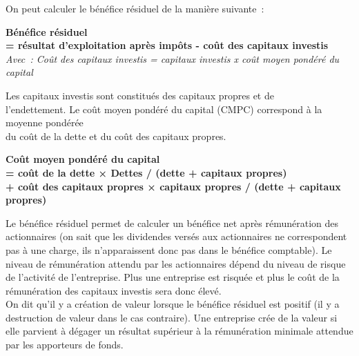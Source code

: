 \documentclass{tufte-handout}
\begin{document}
\begin{enumerate}
On peut calculer le bénéfice résiduel de la manière suivante :\\
\begin{center}
\textbf{Bénéfice résiduel}\\
\textbf{= résultat d'exploitation après impôts - coût des capitaux investis}\\
\emph{Avec : Coût des capitaux investis = capitaux investis x coût moyen pondéré du\\
capital}\\
\end{center}
Les capitaux investis sont constitués des capitaux propres et de\\
l'endettement. Le coût moyen pondéré du capital (CMPC) correspond à la moyenne pondérée\\
du coût de la dette et du coût des capitaux propres.\\
\begin{center}
\textbf{Coût moyen pondéré du capital} \\
\textbf{=  coût de la dette × Dettes / (dette + capitaux propres)} \\
\textbf{+ coût des capitaux propres × capitaux propres / (dette + capitaux propres)}\\
\end{center}

Le bénéfice résiduel permet de calculer un bénéfice net après rémunération des actionnaires (on sait que les dividendes versés aux actionnaires ne correspondent pas à une charge, ils n'apparaissent donc pas dans le bénéfice comptable). Le niveau de rémunération attendu par les actionnaires dépend du niveau de risque de l'activité de l'entreprise. Plus une entreprise est risquée et plus le coût de la rémunération des capitaux investis sera donc élevé.\\

On dit qu'il y a création de valeur lorsque le bénéfice résiduel est positif (il y a destruction de valeur dans le cas contraire). Une entreprise crée de la valeur si elle parvient à dégager un résultat supérieur à la rémunération minimale attendue par les apporteurs de fonds.\\


\end{enumerate}
\end{document}
